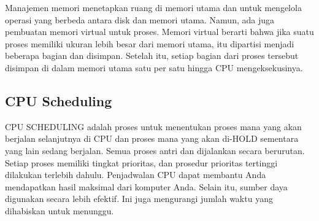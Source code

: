 \documentclass{report}
\begin{document}
	Manajemen memori menetapkan ruang di memori utama dan untuk mengelola operasi yang berbeda antara disk dan memori utama. Namun, ada juga pembuatan memori virtual untuk proses. Memori virtual berarti bahwa jika suatu proses memiliki ukuran lebih besar dari memori utama, itu dipartisi menjadi beberapa bagian dan disimpan. Setelah itu, setiap bagian dari proses tersebut disimpan di dalam memori utama satu per satu hingga CPU mengeksekusinya.
	
	\subsection*{CPU Scheduling}
	
	CPU SCHEDULING adalah proses untuk menentukan proses mana yang akan berjalan selanjutnya di CPU dan proses mana yang akan di-HOLD sementara yang lain sedang berjalan. Semua proses antri dan dijalankan secara berurutan. Setiap proses memiliki tingkat prioritas, dan prosedur prioritas tertinggi dilakukan terlebih dahulu. Penjadwalan CPU dapat membantu Anda mendapatkan hasil maksimal dari komputer Anda. Selain itu, sumber daya digunakan secara lebih efektif. Ini juga mengurangi jumlah waktu yang dihabiskan untuk menunggu.
	
	\vskip0.5cm
	
\end{document}
